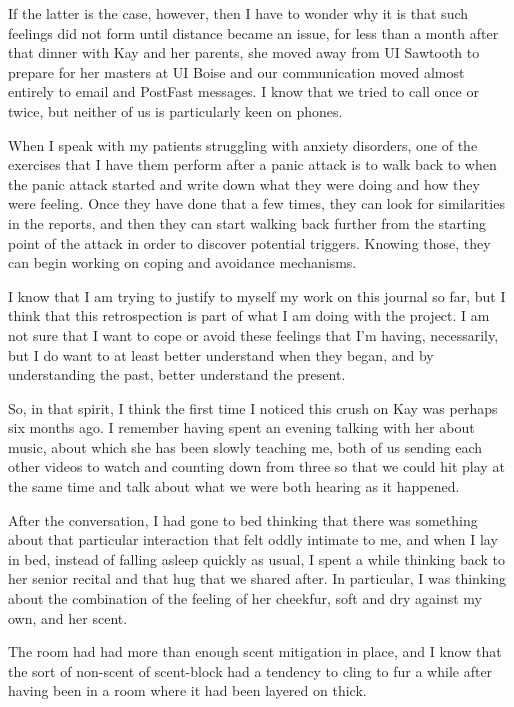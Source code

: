 If the latter is the case, however, then I have to wonder why it is that such feelings did not form until distance became an issue, for less than a month after that dinner with Kay and her parents, she moved away from UI Sawtooth to prepare for her masters at UI Boise and our communication moved almost entirely to email and PostFast messages. I know that we tried to call once or twice, but neither of us is particularly keen on phones.

When I speak with my patients struggling with anxiety disorders, one of the exercises that I have them perform after a panic attack is to walk back to when the panic attack started and write down what they were doing and how they were feeling. Once they have done that a few times, they can look for similarities in the reports, and then they can start walking back further from the starting point of the attack in order to discover potential triggers. Knowing those, they can begin working on coping and avoidance mechanisms.

I know that I am trying to justify to myself my work on this journal so far, but I think that this retrospection is part of what I am doing with the project. I am not sure that I want to cope or avoid these feelings that I'm having, necessarily, but I do want to at least better understand when they began, and by understanding the past, better understand the present.

So, in that spirit, I think the first time I noticed this crush on Kay was perhaps six months ago. I remember having spent an evening talking with her about music, about which she has been slowly teaching me, both of us sending each other videos to watch and counting down from three so that we could hit play at the same time and talk about what we were both hearing as it happened.

After the conversation, I had gone to bed thinking that there was something about that particular interaction that felt oddly intimate to me, and when I lay in bed, instead of falling asleep quickly as usual, I spent a while thinking back to her senior recital and that hug that we shared after. In particular, I was thinking about the combination of the feeling of her cheekfur, soft and dry against my own, and her scent.

The room had had more than enough scent mitigation in place, and I know that the sort of non-scent of scent-block had a tendency to cling to fur a while after having been in a room where it had been layered on thick.

